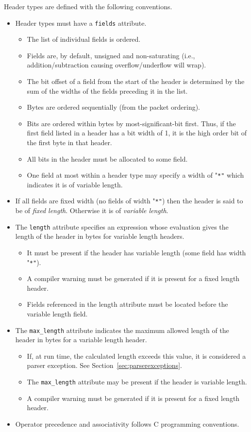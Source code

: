 \documentclass[12pt]{article}
\begin{document}
Header types are defined with the following conventions.
\begin{itemize}
\item
Header types must have a \texttt{fields} attribute. 
\begin{itemize}
\item
The list of individual fields is ordered.
\item
Fields are, by default, unsigned and non-saturating (i.e., addition/subtraction 
causing overflow/underflow will wrap).
\item
The bit offset of a field from the start of the header is determined by the 
sum of the widths of the fields preceding it in the list.
\item
Bytes are ordered sequentially (from the packet ordering).
\item
Bits are ordered within bytes by most-significant-bit first.  Thus, if the 
first field listed in a header has a bit width of 1, it is the high order 
bit of the first byte in that header.
\item
All bits in the header must be allocated to some field.
\item
One field at most within a header type may specify a width of "\texttt{*"} which indicates 
it is of variable length.
\end{itemize}

\item
If all fields are fixed width (no fields of width "\texttt{*"}) then the header is 
said to be of \textit{fixed length}. Otherwise it is of \textit{variable length}.
\item
The \texttt{length} attribute specifies an expression whose evaluation gives the length 
of the header in bytes for variable length headers. 
\begin{itemize}
\item
It must be present if the header has variable length (some field has width 
"\texttt{*"}).
\item
A compiler warning must be generated if it is present for a fixed length header.
\item
Fields referenced in the length attribute must be located before the variable 
length field.
\end{itemize}

\item
The \texttt{max_length} attribute indicates the maximum allowed length of the header 
in bytes for a variable length header. 
\begin{itemize}
\item
If, at run time, the calculated length exceeds this value, it is considered 
a parser exception. See Section~\ref{sec:parserexceptions}.
\item
The \texttt{max_length} attribute may be present if the header is variable length. 

\item
A compiler warning must be generated if it is present for a fixed length header.
\end{itemize}

\item
Operator precedence and associativity follows C programming conventions.
\end{itemize}
\end{document}
